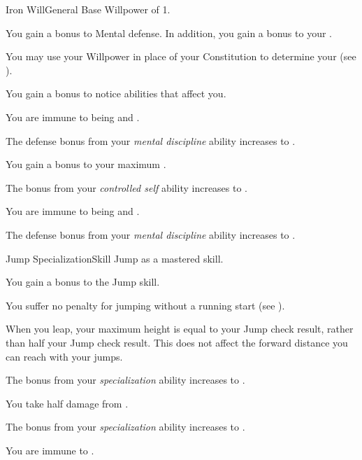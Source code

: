     \begin{feat}{Iron Will}{General}
        \featpre Base Willpower of 1.

         You gain a  bonus to Mental defense.
        In addition, you gain a  bonus to your .

         You may use your Willpower in place of your Constitution to determine your  (see ).

         You gain a  bonus to notice  abilities that affect you.

         You are immune to being  and .

         The defense bonus from your \textit{mental discipline} ability increases to .

         You gain a  bonus to your maximum .

         The bonus from your \textit{controlled self} ability increases to .

         You are immune to being  and .

         The defense bonus from your \textit{mental discipline} ability increases to .
    \end{feat}

    \begin{feat}{Jump Specialization}{Skill}
        \featpre Jump as a mastered skill.

         You gain a  bonus to the Jump skill.

         You suffer no penalty for jumping without a running start (see ).

         When you leap, your maximum height is equal to your Jump check result, rather than half your Jump check result.
        This does not affect the forward distance you can reach with your jumps.

         The bonus from your \textit{specialization} ability increases to .

         You take half damage from .

         The bonus from your \textit{specialization} ability increases to .

         You are immune to .
    \end{feat}

